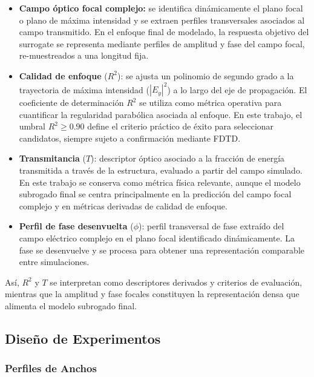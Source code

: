 \begin{itemize}
\item \textbf{Campo óptico focal complejo:} se identifica dinámicamente el plano focal o plano de máxima intensidad y se extraen perfiles transversales asociados al campo transmitido. En el enfoque final de modelado, la respuesta objetivo del surrogate se representa mediante perfiles de amplitud y fase del campo focal, re-muestreados a una longitud fija.

\item \textbf{Calidad de enfoque} ($R^2$): se ajusta un polinomio de segundo grado a la trayectoria de máxima intensidad ($|E_y|^2$) a lo largo del eje de propagación. El coeficiente de determinación $R^2$ se utiliza como métrica operativa para cuantificar la regularidad parabólica asociada al enfoque. En este trabajo, el umbral $R^2 \geq 0.90$ define el criterio práctico de éxito para seleccionar candidatos, siempre sujeto a confirmación mediante FDTD.

\item \textbf{Transmitancia} ($T$): descriptor óptico asociado a la fracción de energía transmitida a través de la estructura, evaluado a partir del campo simulado. En este trabajo se conserva como métrica física relevante, aunque el modelo subrogado final se centra principalmente en la predicción del campo focal complejo y en métricas derivadas de calidad de enfoque.

\item \textbf{Perfil de fase desenvuelta} ($\phi$): perfil transversal de fase extraído del campo eléctrico complejo en el plano focal identificado dinámicamente. La fase se desenvuelve y se procesa para obtener una representación comparable entre simulaciones.

\end{itemize}

Así, $R^2$ y $T$ se interpretan como descriptores derivados y criterios de evaluación, mientras que la amplitud y fase focales constituyen la representación densa que alimenta el modelo subrogado final.

\subsection{Diseño de Experimentos}\label{subsec:doe}

\subsubsection{Perfiles de Anchos}

